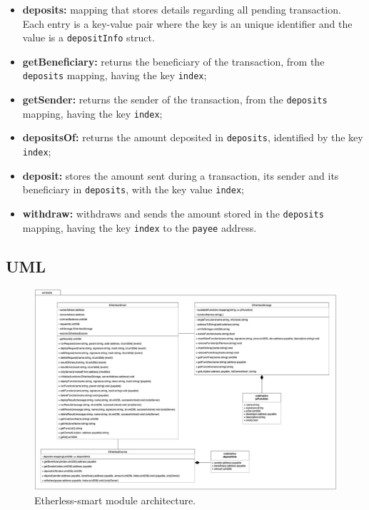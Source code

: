 	\begin{itemize}
		\item \textbf{deposits:} mapping that stores details regarding all pending transaction. Each entry is a key-value pair where the key is an unique identifier and the value is a \texttt{depositInfo} struct.	
		\end{itemize}
	\begin{itemize}
		\item \textbf{getBeneficiary:} returns the beneficiary of the transaction, from the \texttt{deposits} mapping, having the key \texttt{index};
		\item \textbf{getSender:} returns the sender of the transaction, from the \texttt{deposits} mapping, having the key \texttt{index};
		\item \textbf{depositsOf:} returns the amount deposited in \texttt{deposits}, identified by the key \texttt{index};
		\item \textbf{deposit:} stores the amount sent during a transaction, its sender and its beneficiary in \texttt{deposits}, with the key value \texttt{index};
		\item \textbf{withdraw:} withdraws and sends the amount stored in the \texttt{deposits} mapping, having the key \texttt{index} to the \texttt{payee} address.
	\end{itemize}

	\begin{landscape}
	\subsection{UML}
		\begin{figure}[H]
			\includegraphics[width=21cm]{./diagrammi/etherless-smart/Etherless-smart.jpg}
			\caption{Etherless-smart module architecture.}
		\end{figure}
	\end{landscape}
	\restoregeometry

